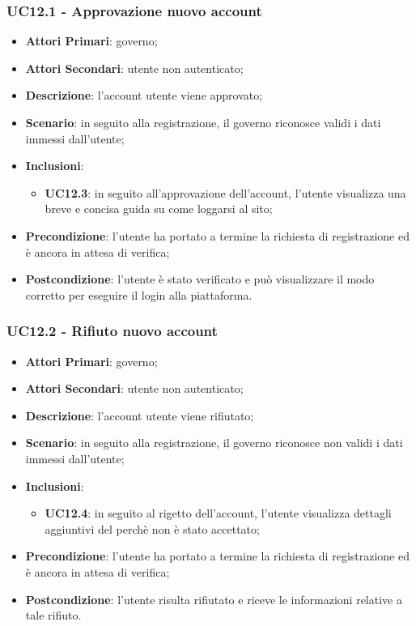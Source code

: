 \subsubsection{UC12.1 - Approvazione nuovo account}
\begin{itemize}
	\item \textbf{Attori Primari}:
	governo;
	\item \textbf{Attori Secondari}:
	utente non autenticato;
	\item \textbf{Descrizione}: l'account utente viene approvato;
	\item \textbf{Scenario}: in seguito alla registrazione, il governo riconosce validi i dati immessi dall'utente;
	\item \textbf{Inclusioni}:
	\begin{itemize}
		\item \textbf{UC12.3}: in seguito all'approvazione dell'account, l'utente visualizza una breve e concisa guida su come loggarsi al sito;
	\end{itemize}
	\item \textbf{Precondizione}: l'utente ha portato a termine la richiesta di registrazione ed è ancora in attesa di verifica;
	\item \textbf{Postcondizione}: l'utente è stato verificato e può visualizzare il modo corretto per eseguire il login alla piattaforma.
	
\end{itemize}
\subsubsection{UC12.2 - Rifiuto nuovo account}
\begin{itemize}
	\item \textbf{Attori Primari}:
	governo;
	\item \textbf{Attori Secondari}:
	utente non autenticato;
	\item \textbf{Descrizione}: l'account utente viene rifiutato;
	\item \textbf{Scenario}: in seguito alla registrazione, il governo riconosce non validi i dati immessi dall'utente;
	\item \textbf{Inclusioni}:
	\begin{itemize}
		\item \textbf{UC12.4}: in seguito al rigetto  dell'account, l'utente visualizza dettagli aggiuntivi del perchè non è stato accettato;
	\end{itemize}
	\item \textbf{Precondizione}: l'utente ha portato a termine la richiesta di registrazione ed è ancora in attesa di verifica;
	\item \textbf{Postcondizione}: l'utente risulta rifiutato e riceve le informazioni relative a tale rifiuto.
	
\end{itemize}
